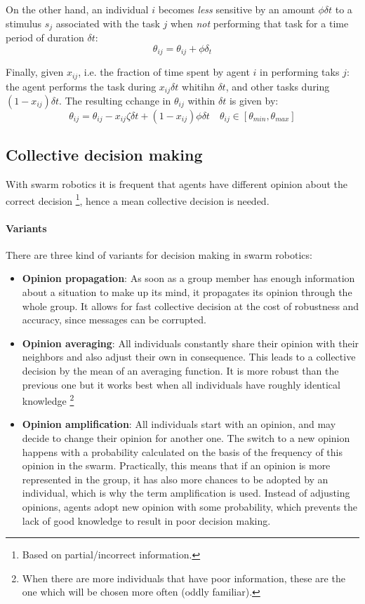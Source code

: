 \documentclass[10pt,a4paper]{article}
\begin{document}
On the other hand, an individual $i$ becomes \textit{less} sensitive by an amount $\phi \delta t$ to a stimulus $s_j$ associated with the task $j$  when \textit{not} performing that task for a time period of duration $\delta t$:
\[\theta_{ij} = \theta_{ij} + \phi\delta_t\]

Finally, given $x_{ij}$, i.e. the fraction of time spent by agent $i$ in performing taks $j$: the agent performs the task during $x_{ij}\delta t$ whitihn $\delta t$, and other tasks during $(1-x_{ij})\delta t$. The resulting cchange in $\theta_{ij}$ within $\delta t$ is given by:
\[\theta_{ij}= \theta_{ij}-x_{ij}\zeta\delta t+ (1-x_{ij})\phi\delta t \quad \theta_{ij} \in [\theta_{min},\theta_{max}]\]


\subsection{Collective decision making}
With swarm robotics it is frequent that agents have different opinion about the correct decision \footnote{Based on partial/incorrect information.}, hence a mean collective decision is needed.

\paragraph{Variants}
There are three kind of variants for decision making in swarm robotics:
\begin{itemize}
\item \textbf{Opinion propagation}: As soon as a group member has enough information about a situation to make up its mind, it propagates its opinion through the whole group. It allows for fast collective decision at the cost of robustness and accuracy, since messages can be corrupted.




\item \textbf{Opinion averaging}: All individuals constantly share their opinion with their neighbors and also adjust their own in consequence. This leads to a collective decision by the mean of an averaging function. It is more robust than the previous one but it works best when all individuals have roughly identical knowledge \footnote{When there are more individuals that have poor information, these are the one which will be chosen more often (oddly familiar).}


\item \textbf{Opinion amplification}:  All individuals start with an opinion, and may decide to change their opinion for another one. The switch to a new opinion happens with a probability calculated on the basis of the frequency of this opinion in the swarm. Practically, this means that if an opinion is more represented in the group, it has also more chances to be adopted by an individual, which is why the term amplification is used. Instead of adjusting opinions, agents adopt new opinion with some probability, which prevents the lack of good knowledge to result in poor decision making.
\end{itemize}
\end{document}
